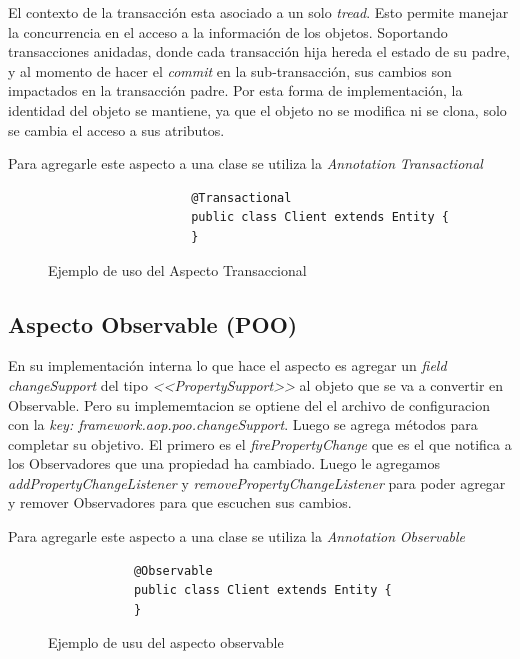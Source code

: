 		\medskip
		
		El contexto de la transacción esta asociado a un solo \emph{tread}. Esto
		permite manejar la concurrencia en el acceso a la información de los objetos. 
		Soportando transacciones anidadas, donde cada transacción hija hereda el estado
		de su padre, y al momento de hacer el \emph{commit} en la sub-transacción, sus
		cambios son impactados en la transacción padre.
		Por esta forma de implementación, la identidad del objeto se mantiene, ya que
		el objeto no se modifica ni se clona, solo se cambia el acceso a sus
		atributos.
		
		Para agregarle este aspecto a una clase se utiliza la \emph{Annotation}
		\emph{Transactional }
				
		\begin{figure}[h]
				\begin{lstlisting} 
					@Transactional
					public class Client extends Entity {
					}
				\end{lstlisting}
			\caption{Ejemplo de uso del Aspecto Transaccional}
			\label{pot}
		\end{figure}  

	\subsection{ Aspecto Observable (POO)}
			
		En su implementación interna lo que hace el aspecto es agregar un \emph{field
		changeSupport} del tipo \emph{<<PropertySupport>>} al objeto que se va a
		convertir en Observable. Pero su implememtacion se optiene del el archivo de
		configuracion con la \emph{key: framework.aop.poo.changeSupport}.
		Luego se agrega métodos para completar su objetivo.
		El primero es el \emph{firePropertyChange} que es el que notifica a los
		Observadores que una propiedad ha cambiado.	Luego le agregamos
		\emph{addPropertyChangeListener} y \emph{removePropertyChangeListener} para
		poder agregar y remover Observadores para que escuchen sus cambios.
		
		Para agregarle este aspecto a una clase se utiliza la \emph{Annotation}
		\emph{Observable}
		
	\begin{figure}[h]
		\begin{lstlisting} 
			@Observable
			public class Client extends Entity {
			}
		\end{lstlisting}
		\caption{Ejemplo de usu del aspecto observable}
		\label{poo}
	\end{figure}  
		


